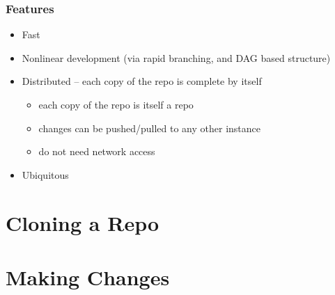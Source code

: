 \documentclass{beamer}
\begin{document}
\begin{frame}
    \frametitle{Features}
    \begin{itemize}
        \item Fast
        \item Nonlinear development (via rapid branching, and DAG based structure)
        \item Distributed -- each copy of the repo is complete by itself
            \begin{itemize}
                \item each copy of the repo is itself a repo
                \item changes can be pushed/pulled to any other instance
                \item do not need network access
            \end{itemize}
        \item Ubiquitous
    \end{itemize}
\end{frame}


\section{Cloning a Repo}


\section{Making Changes}

%
%
%
%
\end{document}
